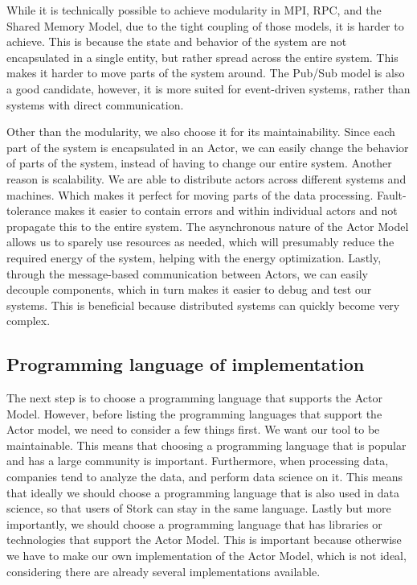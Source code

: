 \documentclass[a4paper]{article}
\begin{document}
While it is technically possible to achieve modularity in MPI, RPC, and the Shared Memory Model, due to the tight coupling of those models, it is harder to achieve. This is because the state and behavior of the system are not encapsulated in a single entity, but rather spread across the entire system. This makes it harder to move parts of the system around. The Pub/Sub model is also a good candidate, however, it is more suited for event-driven systems, rather than systems with direct communication.

Other than the modularity, we also choose it for its maintainability. Since each part of the system is encapsulated in an Actor, we can easily change the behavior of parts of the system, instead of having to change our entire system. Another reason is scalability. We are able to distribute actors across different systems and machines. Which makes it perfect for moving parts of the data processing. Fault-tolerance makes it easier to contain errors and within individual actors and not propagate this to the entire system. The asynchronous nature of the Actor Model allows us to sparely use resources as needed, which will presumably reduce the required energy of the system, helping with the energy optimization. Lastly, through the message-based communication between Actors, we can easily decouple components, which in turn makes it easier to debug and test our systems. This is beneficial because distributed systems can quickly become very complex.
\subsection{Programming language of implementation}
The next step is to choose a programming language that supports the Actor Model. However, before listing the programming languages that support the Actor model, we need to consider a few things first. We want our tool to be maintainable. This means that choosing a programming language that is popular and has a large community is important. Furthermore, when processing data, companies tend to analyze the data, and perform data science on it. This means that ideally we should choose a programming language that is also used in data science, so that users of Stork can stay in the same language. Lastly but more importantly, we should choose a programming language that has libraries or technologies that support the Actor Model. This is important because otherwise we have to make our own implementation of the Actor Model, which is not ideal, considering there are already several implementations available.
\end{document}
